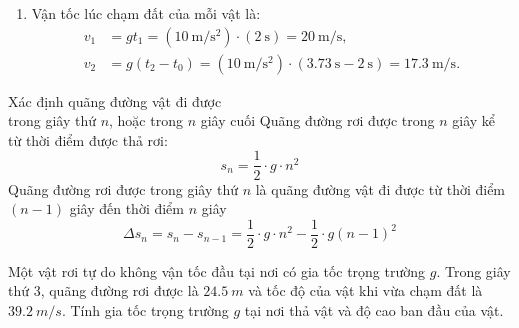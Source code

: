 \begin{vd}
{\begin{enumerate}[label=\alph*.]
			Vậy hai vật không chạm đất cùng lúc.
			\item Vận tốc lúc chạm đất của mỗi vật là:
			\begin{align*}
				v_1&=gt_1=\left(\SI{10}{\meter/\second^{2}}\right)\cdot\left(\SI{2}{\second}\right)=\SI{20}{\meter/\second},\\
				v_2&=g(t_2-t_0)=\left(\SI{10}{\meter/\second^{2}}\right)\cdot(\SI{3.73}{\second}-\SI{2}{\second})=\SI{17.3}{\meter/\second}.
			\end{align*}
		\end{enumerate}
	}
\end{vd}
\begin{dang}{Xác định quãng đường vật đi được \\trong giây thứ $n$, hoặc trong $n$ giây cuối}
	Quãng đường rơi được trong $n$ giây kể từ thời điểm được thả rơi: 
	$$s_n=\dfrac{1}{2}\cdot g \cdot n^2$$
	Quãng đường rơi được trong giây thứ $n$ là quãng đường vật đi được từ thời điểm $\left(n-1\right)$ giây đến thời điểm $n$ giây
	$$\Delta s_n=s_n-s_{n-1}=\dfrac{1}{2}\cdot g\cdot n^2 -\dfrac{1}{2}\cdot g \left(n-1\right)^2$$
	\end{dang}
	\begin{vd}
		Một vật rơi tự do không vận tốc đầu tại nơi có gia tốc trọng trường $g$. Trong giây thứ 3, quãng đường rơi được là $\SI{24,5}{m}$ và tốc độ của vật khi vừa chạm đất là $\SI{39,2}{m/s}$. Tính gia tốc trọng trường $g$ tại nơi thả vật và độ cao ban đầu của vật.
	\end{vd}
	
